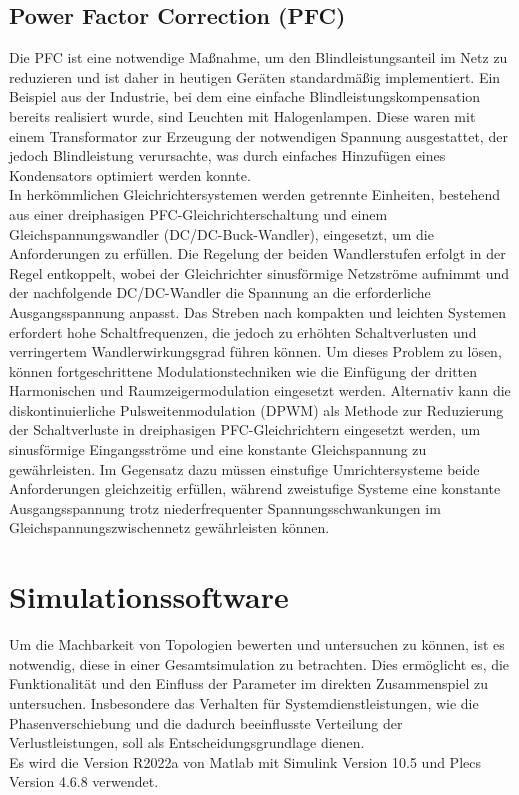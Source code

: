 		\subsection{Power Factor Correction (PFC)}
		Die \gls{PFC} ist eine notwendige Maßnahme, um den Blindleistungsanteil im Netz zu reduzieren und ist daher in heutigen Geräten standardmäßig implementiert. Ein Beispiel aus der Industrie, bei dem eine einfache Blindleistungskompensation bereits realisiert wurde, sind Leuchten mit Halogenlampen. Diese waren mit einem Transformator zur Erzeugung der notwendigen Spannung ausgestattet, der jedoch Blindleistung verursachte, was durch einfaches Hinzufügen eines Kondensators optimiert werden konnte. \\
		In herkömmlichen Gleichrichtersystemen werden getrennte Einheiten, bestehend aus einer dreiphasigen PFC-Gleichrichterschaltung und einem Gleichspannungswandler (DC/DC-Buck-Wandler), eingesetzt, um die Anforderungen zu erfüllen. Die Regelung der beiden Wandlerstufen erfolgt in der Regel entkoppelt, wobei der Gleichrichter sinusförmige Netzströme aufnimmt und der nachfolgende DC/DC-Wandler die Spannung an die erforderliche Ausgangsspannung anpasst. Das Streben nach kompakten und leichten Systemen erfordert hohe Schaltfrequenzen, die jedoch zu erhöhten Schaltverlusten und verringertem Wandlerwirkungsgrad führen können. Um dieses Problem zu lösen, können fortgeschrittene Modulationstechniken wie die Einfügung der dritten Harmonischen und Raumzeigermodulation eingesetzt werden. Alternativ kann die diskontinuierliche Pulsweitenmodulation (DPWM) als Methode zur Reduzierung der Schaltverluste in dreiphasigen PFC-Gleichrichtern eingesetzt werden, um sinusförmige Eingangsströme und eine konstante Gleichspannung zu gewährleisten. Im Gegensatz dazu müssen einstufige Umrichtersysteme beide Anforderungen gleichzeitig erfüllen, während zweistufige Systeme eine konstante Ausgangsspannung trotz niederfrequenter Spannungsschwankungen im Gleichspannungszwischennetz gewährleisten können.			
		
				
			



\section{Simulationssoftware}
	Um die Machbarkeit von Topologien bewerten und untersuchen zu können, ist es notwendig, diese in einer Gesamtsimulation zu betrachten. Dies ermöglicht es, die Funktionalität und den Einfluss der Parameter im direkten Zusammenspiel zu untersuchen. Insbesondere das Verhalten für Systemdienstleistungen, wie die Phasenverschiebung und die dadurch beeinflusste Verteilung der Verlustleistungen, soll als Entscheidungsgrundlage dienen.\\
	Es wird die Version R2022a von Matlab mit Simulink Version 10.5 und Plecs Version 4.6.8 verwendet.  

